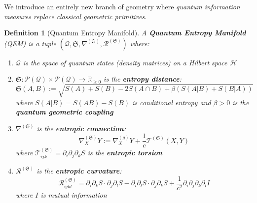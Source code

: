 \documentclass[12pt,a4paper]{article}
\newtheorem{definition}[theorem]{Definition}
\begin{document}
We introduce an entirely new branch of geometry where \emph{quantum information measures replace classical geometric primitives}.

\begin{definition}[Quantum Entropy Manifold]\label{def:qem}
A \textbf{Quantum Entropy Manifold} (QEM) is a tuple $(\mathcal{Q}, \mathfrak{S}, \nabla^{(\mathfrak{S})}, \mathcal{R}^{(\mathfrak{S})})$ where:
\begin{enumerate}
    \item $\mathcal{Q}$ is the space of quantum states (density matrices) on a Hilbert space $\mathcal{H}$
    \item $\mathfrak{S}: \mathcal{P}(\mathcal{Q}) \times \mathcal{P}(\mathcal{Q}) \to \mathbb{R}_{\geq 0}$ is the \textbf{entropy distance}:
    \begin{equation}
    \mathfrak{S}(A, B) := \sqrt{S(A) + S(B) - 2S(A \cap B) + \beta(S(A|B) + S(B|A))}
    \end{equation}
    where $S(A|B) = S(AB) - S(B)$ is conditional entropy and $\beta > 0$ is the \textbf{quantum geometric coupling}
    \item $\nabla^{(\mathfrak{S})}$ is the \textbf{entropic connection}:
    \begin{equation}
    \nabla^{(\mathfrak{S})}_X Y := \nabla^{(g)}_X Y + \frac{1}{c}\mathcal{T}^{(\mathfrak{S})}(X, Y)
    \end{equation}
    where $\mathcal{T}^{(\mathfrak{S})}_{ijk} = \partial_i \partial_j \partial_k S$ is the \textbf{entropic torsion}
    \item $\mathcal{R}^{(\mathfrak{S})}$ is the \textbf{entropic curvature}:
    \begin{equation}
    \mathcal{R}^{(\mathfrak{S})}_{ijkl} = \partial_i \partial_k S \cdot \partial_j \partial_l S - \partial_i \partial_l S \cdot \partial_j \partial_k S + \frac{1}{c^2} \partial_i \partial_j \partial_k \partial_l I
    \end{equation}
    where $I$ is mutual information
\end{enumerate}
\end{definition}
\end{document}

